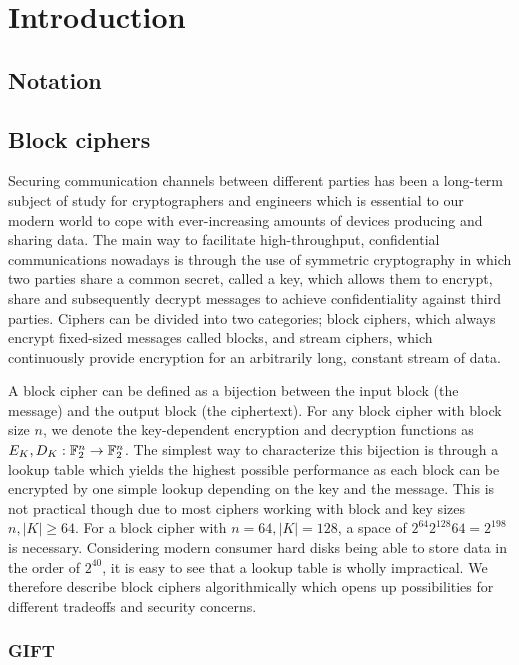 \chapter{Introduction}
\section{Notation}

\section{Block ciphers}

Securing communication channels between different parties has been a long-term
subject of study for cryptographers and engineers which is essential to our
modern world to cope with ever-increasing amounts of devices producing and
sharing data. The main way to facilitate high-throughput, confidential
communications nowadays is through the use of symmetric cryptography in which
two parties share a common secret, called a key, which allows them to encrypt,
share and subsequently decrypt messages to achieve confidentiality against
third parties. Ciphers can be divided into two categories; block ciphers, which
always encrypt fixed-sized messages called blocks, and stream ciphers, which
continuously provide encryption for an arbitrarily long, constant stream of
data.

A block cipher can be defined as a bijection between the input block (the
message) and the output block (the ciphertext). For any block cipher with block
size $n$, we denote the key-dependent encryption and decryption functions as
$E_K,D_K:\mathbb{F}_2^{n}\rightarrow \mathbb{F}_2^{n}$. The simplest way to
characterize this bijection is through a lookup table which yields the highest
possible performance as each block can be encrypted by one simple lookup
depending on the key and the message. This is not practical though due to most
ciphers working with block and key sizes $n,|K|\geq 64$. For a block cipher
with $n=64,|K|=128$, a space of $2^{64}2^{128}64=2^{198}$ is necessary.
Considering modern consumer hard disks being able to store data in the order of
$2^{40}$, it is easy to see that a lookup table is wholly impractical. We
therefore describe block ciphers algorithmically which opens up possibilities
for different tradeoffs and security concerns.


\subsection{GIFT}

